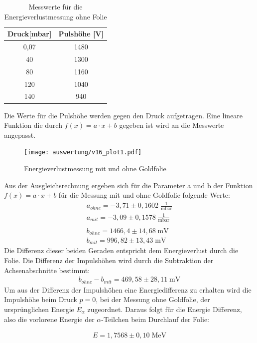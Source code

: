 \begin{table}[H]
	\centering
	\begin{tabular}{c|c}

	Druck[mbar] & Pulshöhe  [V] \\
		\hline
0,07	& 1480\\
40	& 1300\\
80	& 1160\\
120	& 1040\\
140	& 940\\

	\end{tabular}
	\caption{Messwerte für die Energieverlustmessung ohne Folie }
	\label{tab:ohne}
\end{table}

Die Werte für die Pulshöhe werden gegen den Druck aufgetragen. Eine lineare Funktion die durch $f(x)=a\cdot x+b$ gegeben ist wird an die Messwerte angepasst.
\begin{figure}[h]
	\centering
	\texttt{[image: auswertung/v16\_plot1.pdf]}
	\caption{Energieverlustmessung mit und ohne Goldfolie}
	\label{img:grafik-dummy}
\end{figure}
\newpage
Aus der Ausgleichsrechnung ergeben sich für die Parameter a und b der Funktion $f(x)=a\cdot x+b$ für die Messung mit und ohne Goldfolie folgende Werte:
\begin{align*}
a_{ohne}= -3,71 \pm 0,1602 \; \frac{1}{\text{mbar}}
\\
a_{mit}= -3,09 \pm 0,1578 \; \frac{1}{\text{mbar}}
\\
\\
b_{ohne}= 1466,4 \pm 14,68 \; \text{mV}
\\
b_{mit}= 996,82 \pm  13,43 \; \text{mV}
\end{align*}
Die Differenz dieser beiden Geraden entspricht dem Energieverlust durch die Folie. Die Differenz der Impulshöhen wird durch die Subtraktion der Achsenabschnitte bestimmt:
\begin{align}
b_{ohne}-b_{mit}= 469,58 \pm 28,11 \; \text{mV}
\end{align}
Um aus der Differenz der Impulshöhen eine Energiedifferenz zu erhalten wird die Impulshöhe beim Druck $p=0$, bei der Messung ohne Goldfolie, der ursprünglichen Energie $E_\alpha$ zugeordnet. Daraus folgt für die Energie Differenz, also die vorlorene Energie der $\alpha$-Teilchen beim Durchlauf der Folie:

\begin{align*}
 E= 1,7568 \pm 0,10\;  \text{MeV}
\end{align*}

